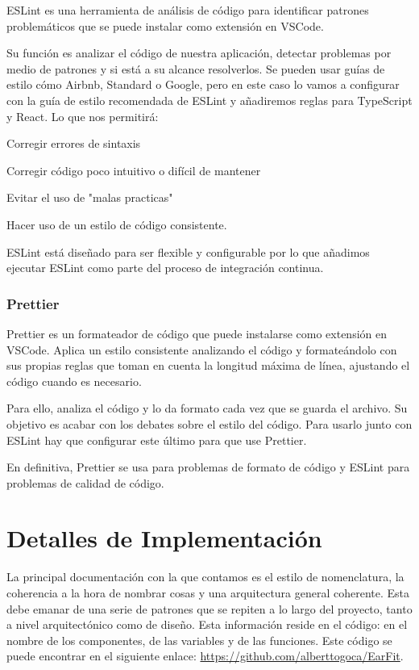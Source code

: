 \documentclass[12pt,twoside,titlepage]{report}
\begin{document}
ESLint es una herramienta de análisis de código para identificar patrones problemáticos que se puede instalar como extensión en VSCode.

Su función es analizar el código de nuestra aplicación, detectar problemas por medio de patrones y si está a su alcance resolverlos. Se pueden usar guías de estilo cómo Airbnb, Standard o Google, pero en este caso lo vamos a configurar con la guía de estilo recomendada de ESLint y añadiremos reglas para TypeScript y React. Lo que nos permitirá:

\begin{compactitem}
 \item Corregir errores de sintaxis
 \item Corregir código poco intuitivo o difícil de mantener
 \item Evitar el uso de "malas practicas"
 \item Hacer uso de un estilo de código consistente.
\end{compactitem}

ESLint está diseñado para ser flexible y configurable por lo que añadimos ejecutar ESLint como parte del proceso de integración continua.

\subsubsection{Prettier}

Prettier es un formateador de código que puede instalarse como extensión en VSCode. Aplica un estilo consistente analizando el código y formateándolo con sus propias reglas que toman en cuenta la longitud máxima de línea, ajustando el código cuando es necesario.

Para ello, analiza el código y lo da formato cada vez que se guarda el archivo. Su objetivo es acabar con los debates sobre el estilo del código. Para usarlo junto con ESLint hay que configurar este último para que use Prettier.

En definitiva, Prettier se usa para problemas de formato de código y ESLint para problemas de calidad de código.

\section{Detalles de Implementación}
La principal documentación con la que contamos es el estilo de nomenclatura, la coherencia a la hora de nombrar cosas y una arquitectura general coherente. Esta debe emanar de una serie de patrones que se repiten a lo largo del proyecto, tanto a nivel arquitectónico como de diseño. Esta información reside en el código: en el nombre de los componentes, de las variables y de las funciones. Este código se puede encontrar en el siguiente enlace: \url{https://github.com/alberttogoca/EarFit}.
\end{document}
